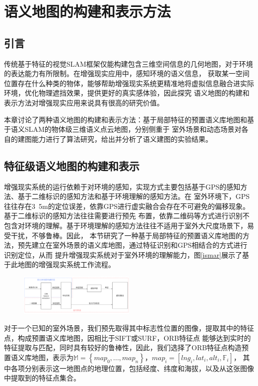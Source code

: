 \chapter{语义地图的构建和表示方法}\label{chap:4}
\section{引言}
传统基于特征的视觉SLAM框架仅能构建包含三维空间信息的几何地图，对于环境的表达能力有所限制。在增强现实应用中，感知环境的语义信息，
获取某一空间位置存在什么种类的物体，能够帮助增强现实系统更精准地将虚拟信息融合进实际环境，优化物理遮挡效果，提供更好的真实感体验，因此探究
语义地图的构建和表示方法对增强现实应用来说具有很高的研究价值。

本章讨论了两种语义地图的构建和表示方法：基于局部特征的预置语义库地图和基于语义SLAM的物体级三维语义点云地图，分别侧重于
室外场景和动态场景对各自的建图能力进行了算法研究，给出并分析了语义建图的实验结果。
\section{特征级语义地图的构建和表示}\label{cha_41}
增强现实系统的运行依赖于对环境的感知，实现方式主要包括基于GPS的感知方法、基于二维标识的感知方法和基于环境理解的感知方法。在
室外环境下，GPS往往存在3~5m的定位误差，依靠GPS进行虚实融合会存在不可避免的偏移现象。基于二维标识的感知方法往往需要进行预先
布置，依靠二维码等方式进行识别不包含对环境的理解。基于环境理解的感知方法往往不适用于室外大尺度场景下，易受干扰，不够鲁棒。因此，
本节研究了一种基于局部特征的预置语义库地图的方法，预先建立在室外场景的语义库地图，通过特征识别和GPS相结合的方式进行识别定位，从而
提升增强现实系统对于室外环境的理解能力，图\ref{ismar}展示了基于此地图的增强现实系统工作流程。
\begin{figure}[!htbp]
    \centering
    \includegraphics[width=0.5\textwidth]{Img/4-ismar.png}
    \label{fig:ismar}
\end{figure}
对于一个已知的室外场景，我们预先取得其中标志性位置的图像，提取其中的特征点，构成预置语义库地图，因相比于SIFT或SURF，ORB特征点
能够达到实时的特征提取与匹配，同时具有较好的鲁棒性，因此，我们选择了ORB特征点构造预置语义库地图，表示为$\mathbb{M}=\left\{map_{0},...,map_{n}\right\}$，$map_{i}=\left[lng_{i},lat_{i},alt_{i},\mathbb{F}_{i}\right]$，
其中各项分别表示这一地图点的地理位置，包括经度、纬度和海拔，以及从这张图像中提取到的特征点集合。

